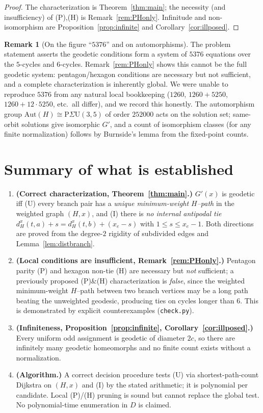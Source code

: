 \documentclass{amsart}
\theoremstyle{definition}
\newtheorem{remark}{Remark}
\begin{document}
\begin{proof}
The characterization is Theorem~\ref{thm:main}; the necessity (and
insufficiency) of (P),(H) is Remark~\ref{rem:PHonly}. Infinitude and
non-isomorphism are Proposition~\ref{prop:infinite} and
Corollary~\ref{cor:illposed}.
\end{proof}

\begin{remark}[On the figure ``$5376$'' and on automorphisms]
The problem statement asserts the geodetic conditions form a system of $5376$
equations over the $5$-cycles and $6$-cycles. Remark~\ref{rem:PHonly} shows this
cannot be the full geodetic system: pentagon/hexagon conditions are necessary but
not sufficient, and a complete characterization is inherently global. We were
unable to reproduce $5376$ from any natural local bookkeeping ($1260$,
$1260+5250$, $1260+12\cdot5250$, etc.\ all differ), and we record this honestly.
The automorphism group $\mathrm{Aut}(H)\cong\mathrm P\Sigma\mathrm U(3,5)$ of
order $252000$ acts on the solution set; same-orbit solutions give isomorphic
$G'$, and a count of isomorphism classes (for any finite normalization) follows
by Burnside's lemma from the fixed-point counts.
\end{remark}

\section{Summary of what is established}

\begin{enumerate}
\item \textbf{(Correct characterization, Theorem~\ref{thm:main}.)} $G'(x)$ is
geodetic iff (U) every branch pair has a \emph{unique minimum-weight $H$--path}
in the weighted graph $(H,x)$, and (I) there is \emph{no internal antipodal tie}
$d^x_H(t,a)+s=d^x_H(t,b)+(x_e-s)$ with $1\le s\le x_e-1$. Both directions are
proved from the degree-$2$ rigidity of subdivided edges and
Lemma~\ref{lem:distbranch}.
\item \textbf{(Local conditions are insufficient, Remark~\ref{rem:PHonly}.)}
Pentagon parity (P) and hexagon non-tie (H) are necessary but \emph{not}
sufficient; a previously proposed (P)\&(H) characterization is \emph{false},
since the weighted minimum-weight $H$--path between two branch vertices may be a
long path beating the unweighted geodesic, producing ties on cycles longer than
$6$. This is demonstrated by explicit counterexamples (\texttt{check.py}).
\item \textbf{(Infiniteness, Proposition~\ref{prop:infinite},
Corollary~\ref{cor:illposed}.)} Every uniform odd assignment is geodetic of
diameter $2c$, so there are infinitely many geodetic homeomorphs and no finite
count exists without a normalization.
\item \textbf{(Algorithm.)} A correct decision procedure tests (U) via
shortest-path-count Dijkstra on $(H,x)$ and (I) by the stated arithmetic; it is
polynomial per candidate. Local (P)/(H) pruning is sound but cannot replace the
global test. No polynomial-time enumeration in $D$ is claimed.
\end{enumerate}
\end{document}
